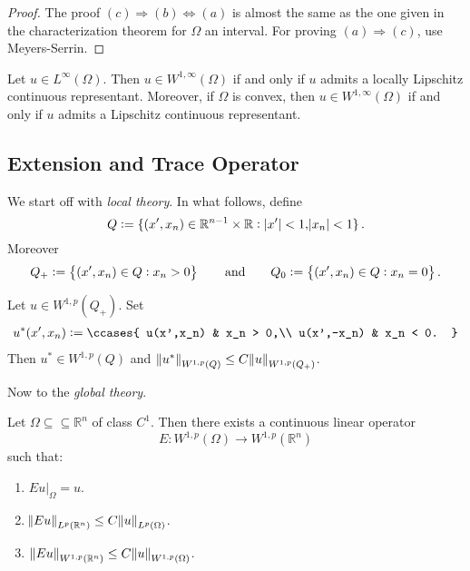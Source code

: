 \begin{proof}
	The proof $(c)\Rightarrow(b)\Leftrightarrow(a)$ is almost the same as the one given in the characterization theorem for $\Omega$ an interval. For proving $(a)\Rightarrow(c)$, use Meyers-Serrin.
\end{proof}

\begin{corollary}
	Let $u \in L^\infty(\Omega)$. Then $u \in W^{1,\infty}(\Omega)$ if and only if $u$ admits a locally Lipschitz continuous representant. Moreover, if $\Omega$ is convex, then $u \in W^{1,\infty}(\Omega)$ if and only if $u$ admits a Lipschitz continuous representant. 
\end{corollary}

\subsection*{Extension and Trace Operator}

We start off with \emph{local theory}. In what follows, define
\begin{equation*}
	Q := \cbr[0]{(x',x_n) \in \mathbb{R}^{n - 1} \times \mathbb{R} : \abs[0]{x'} < 1, \abs{x_n} < 1}.
\end{equation*}
\noindent Moreover
\begin{equation*}
	Q_+ := \cbr{(x',x_n) \in Q : x_n > 0} \qquad \text{and} \qquad Q_0 := \cbr{(x',x_n) \in Q : x_n = 0}.
\end{equation*}

\begin{lemma}
	Let $u \in W^{1,p}(Q_+)$. Set
	\begin{align*}
		u^*(x',x_n) := \ccases{
			u(x',x_n) & x_n > 0,\\
			u(x',-x_n) & x_n < 0.
		}
	\end{align*}
	Then $u^* \in W^{1,p}(Q)$ and $\norm[0]{u^*}_{W^{1,p}(Q)} \leq C \norm{u}_{W^{1,p}(Q_+)}$.
\end{lemma}

Now to the \emph{global theory}.

\begin{theorem}[Extension]
	Let $\Omega \subseteq\subseteq \mathbb{R}^n$ of class $C^1$. Then there exists a continuous linear operator
	\begin{equation*}
		E : W^{1,p}(\Omega) \to W^{1,p}(\mathbb{R}^n)
	\end{equation*}
	\noindent such that:
	\begin{enumerate}[label = \textup{(}\roman*\textup{)},wide = 0pt]
		\item $Eu\vert_\Omega = u$.
		\item $\norm{Eu}_{L^p(\mathbb{R}^n)} \leq C \norm{u}_{L^p(\Omega)}$.
		\item $\norm[0]{Eu}_{W^{1,p}(\mathbb{R}^n)} \leq C\norm{u}_{W^{1,p}(\Omega)}$.
	\end{enumerate}
\end{theorem}

